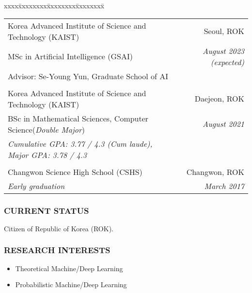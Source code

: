 \documentclass[10pt,a4]{article}
\begin{document}
\begin{small}

\begin{tabbing}
xxxx\=xxxxxxxx\=xxxxxxxx\=xxxxxxxx\=\kill

\>\begin{tabular*}{0.9\linewidth}{l@{\extracolsep{\fill}}r}
Korea Advanced Institute of Science and Technology (KAIST) & Seoul, ROK \\
MSc in Artificial Intelligence (GSAI) & {\it August 2023 (expected)}\\
Advisor: Se-Young Yun, Graduate School of AI \\
& \\
	
Korea Advanced Institute of Science and Technology (KAIST) & Daejeon, ROK \\
BSc in Mathematical Sciences, Computer Science({\it Double Major}) & {\it August 2021}\\
{\it Cumulative GPA: 3.77 / 4.3 (Cum laude), Major GPA: 3.78 / 4.3} \\
 & \\
 
Changwon Science High School (CSHS) & Changwon, ROK \\
{\it Early graduation} & {\it March 2017}
\end{tabular*}
\end{tabbing}

\subsubsection*{CURRENT STATUS}
\begin{list}{}{}
\item Citizen of Republic of Korea (ROK).
\end{list}

\subsubsection*{RESEARCH INTERESTS}

\begin{itemize}{}{}
\item Theoretical Machine/Deep Learning

\item Probabilistic Machine/Deep Learning


\end{itemize}
\end{small}
\end{document}

